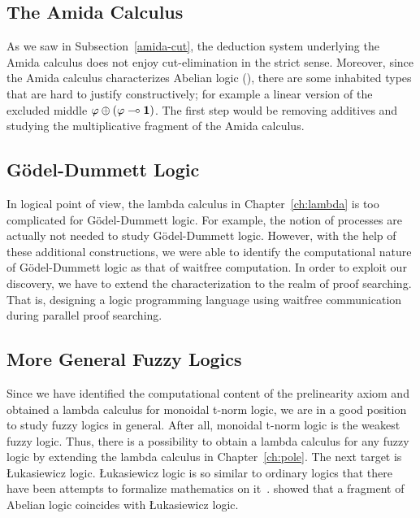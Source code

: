 \subsection{The Amida Calculus}

As we saw in Subsection~\ref{amida-cut},
the deduction system underlying the Amida calculus does not enjoy
cut-elimination in the strict sense.
Moreover, since the Amida calculus characterizes Abelian logic
(),
there are some inhabited types that are hard to justify constructively;
for example a linear version of the excluded middle $\varphi\oplus(\varphi\multimap\mathbf{1})$.
The first step would be removing additives and studying the
multiplicative fragment of the Amida calculus.

\subsection{G\"odel-Dummett Logic}

In logical point of view, the lambda calculus in Chapter~\ref{ch:lambda}
is too complicated for G\"odel-Dummett logic.
For example, the notion of processes are actually not needed to study
G\"odel-Dummett logic.  However, with the help of these additional
constructions,
we were able to identify the computational nature of G\"odel-Dummett
logic as that of waitfree computation.
In order to exploit our discovery, we have to extend the
characterization to the realm of proof searching.  That is, designing a
logic programming language using waitfree communication during parallel
proof searching.

\subsection{More General Fuzzy Logics}

Since we have identified the computational content of the prelinearity
axiom and obtained a lambda calculus for monoidal t-norm logic, we are
in a good position to study fuzzy logics in general.
After all, monoidal t-norm logic is the weakest fuzzy logic.
Thus, there is a possibility to obtain a lambda calculus for any fuzzy
logic by extending the lambda calculus in Chapter~\ref{ch:pole}.
The next target is \L{}ukasiewicz logic.  \L{}ukasiewicz logic is so
similar to ordinary logics that there have been attempts to formalize
mathematics on
it~\citep{Hajek:TheJournalOfSymbolicLogic:2000,hajek2005,yatabe2009}.
\citet[Theorem~9]{metcalfe2002} showed that a fragment of Abelian logic
coincides with \L{}ukasiewicz logic.

